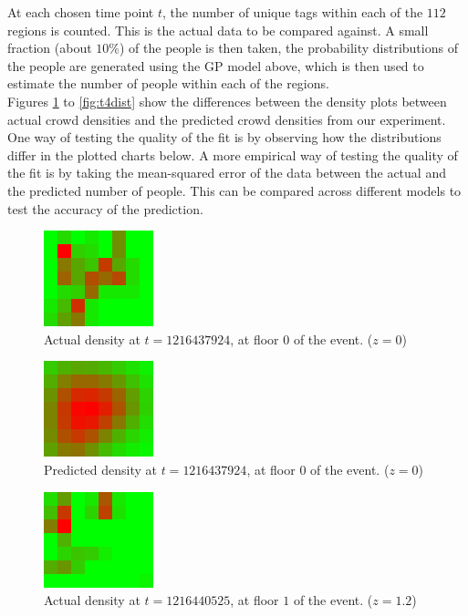\documentclass[letterpaper]{article}
\begin{document}
At each chosen time point $t$, the number of unique tags within each of the $112$ regions is counted. This is the actual data to be compared against. A small fraction (about $10\%$) of the people is then taken, the probability distributions of the people are generated using the GP model above, which is then used to estimate the number of people within each of the regions. \\

Figures \ref{fig:t1dist} to \ref{fig:t4dist} show the differences between the density plots between actual crowd densities and the predicted crowd densities from our experiment. One way of testing the quality of the fit is by observing how the distributions differ in the plotted charts below. A more empirical way of testing the quality of the fit is by taking the mean-squared error of the data between the actual and the predicted number of people. This can be compared across different models to test the accuracy of the prediction.

\begin{figure}[h!]
  \centering
    \includegraphics[width=120px,natwidth=320,natheight=280]{selected_renders/0_1216437924.png}
  \caption{Actual density at $t=1216437924$, at floor $0$ of the event. ($z = 0$)}
  \label{fig:t1dist}
\end{figure}

\begin{figure}[h!]
  \centering
    \includegraphics[width=120px,natwidth=320,natheight=280]{selected_renders/0_1216437924p.png}
  \caption{Predicted density at $t=1216437924$, at floor $0$ of the event. ($z = 0$)}
  \label{fig:t2dist}
\end{figure}

\begin{figure}[h!]
  \centering
    \includegraphics[width=120px,natwidth=320,natheight=280]{selected_renders/1_1216440525.png}
  \caption{Actual density at $t=1216440525$, at floor $1$ of the event. ($z = 1.2$)}
  \label{fig:t3dist}
\end{figure}
\end{document}
